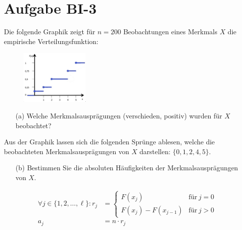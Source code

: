 
\section{Aufgabe BI-3}

\begin{task}
    Die folgende Graphik zeigt für $n=200$ Beobachtungen eines Merkmals $X$ die empirische Verteilungsfunktion:

    \begin{figure}[H]
        \begin{center}
            \includegraphics[width=0.3\textwidth]{assets/task3.png}
        \end{center}
    \end{figure}

    \begin{enumerate}
        \item[(a)] Welche Merkmalsausprägungen (verschieden, positiv) wurden für $X$ beobachtet?
    \end{enumerate}
\end{task}

Aus der Graphik lassen sich die folgenden Sprünge ablesen, welche die beobachteten Merkmalsausprägungen von $X$ darstellen: $\lbrace 0, 1, 2, 4, 5 \rbrace$.

\begin{task}
    \begin{enumerate}
        \item[(b)] Bestimmen Sie die absoluten Häufigkeiten der Merkmalsausprägungen von $X$.
    \end{enumerate}
\end{task}

$$
\begin{aligned}
    \forall j\in\lbrace 1,2,\ldots,\ell\rbrace:
    r_j &= \begin{cases}
        F(x_j)              &\text{für}~j=0 \\
        F(x_j) - F(x_{j-1}) &\text{für}~j>0
    \end{cases} \\
    a_j &= n\cdot r_j
\end{aligned}
$$

